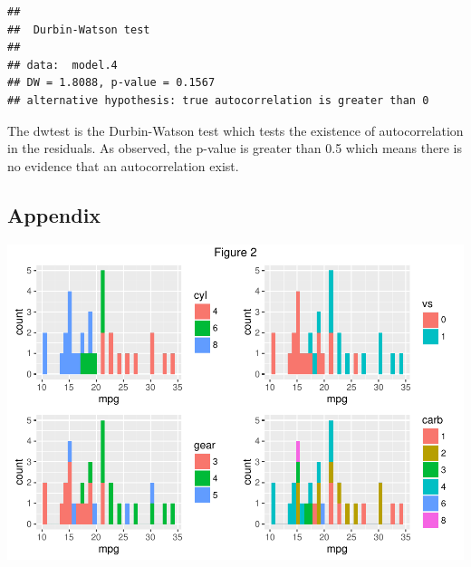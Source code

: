 \documentclass[]{article}
\begin{document}
\begin{verbatim}
## 
##  Durbin-Watson test
## 
## data:  model.4
## DW = 1.8088, p-value = 0.1567
## alternative hypothesis: true autocorrelation is greater than 0
\end{verbatim}

The dwtest is the Durbin-Watson test which tests the existence of
autocorrelation in the residuals. As observed, the p-value is greater
than 0.5 which means there is no evidence that an autocorrelation exist.

\subsection{Appendix}\label{appendix}

\begin{center}\includegraphics{Course_7_Week_4_Regression_Models_files/figure-latex/unnamed-chunk-13-1} \end{center}
\end{document}
